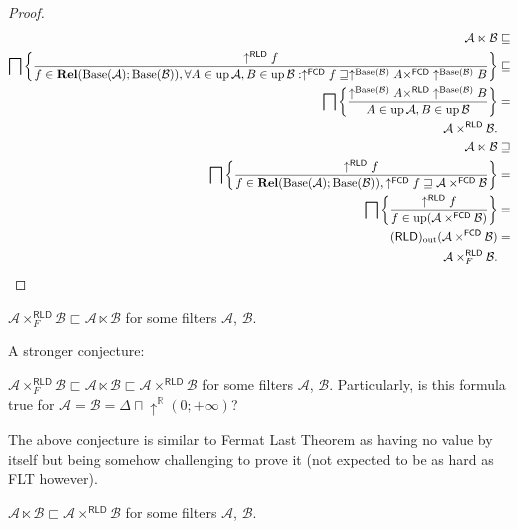 \begin{proof}
~
\begin{align*}
\mathcal{A}\ltimes\mathcal{B} & \sqsubseteq\\
\bigsqcap\left\{ \frac{\uparrow^{\mathsf{RLD}}f}{f\in\mathbf{Rel}(\operatorname{Base}(\mathcal{A});\operatorname{Base}(\mathcal{B})),\forall A\in\operatorname{up}\mathcal{A},B\in\operatorname{up}\mathcal{B}:\uparrow^{\mathsf{FCD}}f\sqsupseteq\uparrow^{\operatorname{Base}(\mathcal{B})}A\times^{\mathsf{FCD}}\uparrow^{\operatorname{Base}(\mathcal{B})}B}\right\} & \sqsubseteq\\
\bigsqcap\left\{ \frac{\uparrow^{\operatorname{Base}(\mathcal{B})}A\times^{\mathsf{RLD}}\uparrow^{\operatorname{Base}(\mathcal{B})}B}{A\in\operatorname{up}\mathcal{A},B\in\operatorname{up}\mathcal{B}}\right\} & =\\
\mathcal{A}\times^{\mathsf{RLD}}\mathcal{B}.\\
\mathcal{A}\ltimes\mathcal{B} & \sqsupseteq\\
\bigsqcap\left\{ \frac{\uparrow^{\mathsf{RLD}}f}{f\in\mathbf{Rel}(\operatorname{Base}(\mathcal{A});\operatorname{Base}(\mathcal{B})),\uparrow^{\mathsf{FCD}}f\sqsupseteq\mathcal{A}\times^{\mathsf{FCD}}\mathcal{B}}\right\} & =\\
\bigsqcap\left\{ \frac{\uparrow^{\mathsf{RLD}}f}{f\in\operatorname{up}(\mathcal{A}\times^{\mathsf{FCD}}\mathcal{B})}\right\} & =\\
(\mathsf{RLD})_{\mathrm{out}}(\mathcal{A}\times^{\mathsf{FCD}}\mathcal{B}) & =\\
\mathcal{A}\times_{F}^{\mathsf{RLD}}\mathcal{B}.
\end{align*}
\end{proof}
\begin{conjecture}
$\mathcal{A}\times_{F}^{\mathsf{RLD}}\mathcal{B}\sqsubset\mathcal{A}\ltimes\mathcal{B}$
for some filters $\mathcal{A}$, $\mathcal{B}$.
\end{conjecture}
A stronger conjecture:
\begin{conjecture}
$\mathcal{A}\times_{F}^{\mathsf{RLD}}\mathcal{B}\sqsubset\mathcal{A}\ltimes\mathcal{B}\sqsubset\mathcal{A}\times^{\mathsf{RLD}}\mathcal{B}$
for some filters $\mathcal{A}$, $\mathcal{B}$. Particularly, is
this formula true for $\mathcal{A}=\mathcal{B}=\Delta\sqcap\uparrow^{\mathbb{R}}(0;+\infty)$?
\end{conjecture}
The above conjecture is similar to Fermat Last Theorem as having no
value by itself but being somehow challenging to prove it (not expected
to be as hard as FLT however).
\begin{example}
$\mathcal{A}\ltimes\mathcal{B}\sqsubset\mathcal{A}\times^{\mathsf{RLD}}\mathcal{B}$
for some filters $\mathcal{A}$, $\mathcal{B}$.\end{example}
